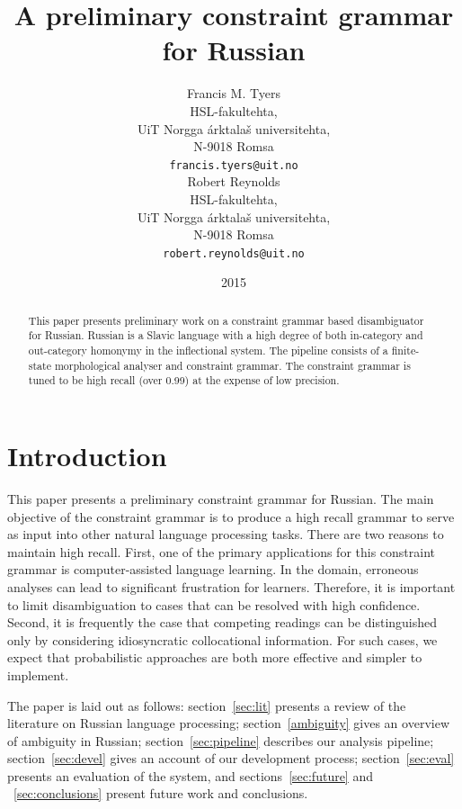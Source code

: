 \documentclass[11pt]{article}
\title{A preliminary constraint grammar for Russian}
\author{Francis M. Tyers \\
  HSL-fakultehta, \\
  UiT Norgga árktalaš universitehta, \\
  N-9018 Romsa \\
  {\tt francis.tyers@uit.no} \\\And
  Robert Reynolds \\
  HSL-fakultehta, \\
  UiT Norgga árktalaš universitehta, \\
  N-9018 Romsa \\
  {\tt robert.reynolds@uit.no} \\}
\date{2015}
\newcommand{\rr}[1]{\marginpar{\scriptsize R: #1}} %
\begin{document}
\maketitle
\begin{abstract}
 This paper presents preliminary work on a constraint
 grammar based disambiguator for Russian. Russian is
 a Slavic language with a high degree of both in-category
 and out-category homonymy in the inflectional system.
 The pipeline consists of a finite-state morphological
 analyser and constraint grammar. The constraint 
 grammar is tuned to be high recall (over 0.99) at the expense of 
 low precision.
\end{abstract}

\section{Introduction}

This paper presents a preliminary constraint grammar for Russian. The main 
objective of the constraint grammar is to produce a high recall grammar to serve
as input into other natural language processing tasks. There are two reasons to
maintain high recall. First, one of the primary applications for this constraint grammar
is computer-assisted language learning. In the domain, erroneous analyses can lead to
significant frustration for learners. Therefore, it is important to limit disambiguation
to cases that can be resolved with high confidence.
Second, it is frequently the case that competing readings can
be distinguished only by considering idiosyncratic collocational information. For such cases, 
we expect that probabilistic approaches are both more effective and simpler to implement.

The paper is laid out as follows: section~\ref{sec:lit} presents a review of 
the literature on Russian language processing; section~\ref{ambiguity} gives
an overview of ambiguity in Russian; section~\ref{sec:pipeline} describes
our analysis pipeline; section~\ref{sec:devel} gives an account of our 
development process; section~\ref{sec:eval} presents an evaluation of the 
system, and sections~\ref{sec:future} and ~\ref{sec:conclusions} present future
work and conclusions.



\end{document}
